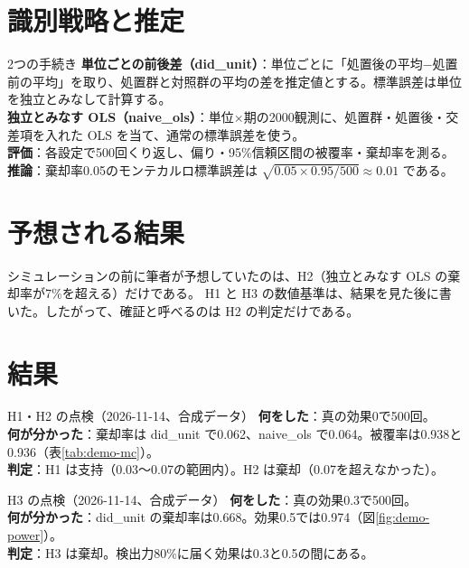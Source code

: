 \documentclass[a4paper,10pt]{ltjsarticle}
\begin{document}
\section{識別戦略と推定}\label{sec:demo-design}

\begin{design}{2つの手続き}
\textbf{単位ごとの前後差（did\_unit）}：単位ごとに「処置後の平均−処置前の平均」を取り、処置群と対照群の平均の差を推定値とする。標準誤差は単位を独立とみなして計算する。\\
\textbf{独立とみなす OLS（naive\_ols）}：単位×期の2000観測に、処置群・処置後・交差項を入れた OLS を当て、通常の標準誤差を使う。\\
\textbf{評価}：各設定で500回くり返し、偏り・95\%信頼区間の被覆率・棄却率を測る。\\
\textbf{推論}：棄却率0.05のモンテカルロ標準誤差は $\sqrt{0.05\times0.95/500}\approx0.01$ である。
\end{design}

\section{予想される結果}\label{sec:demo-expected}
シミュレーションの前に筆者が予想していたのは、H2（独立とみなす OLS の棄却率が7\%を超える）だけである。
H1 と H3 の数値基準は、結果を見た後に書いた。したがって、確証と呼べるのは H2 の判定だけである。

\section{結果}\label{sec:demo-result}

\begin{result}{H1・H2 の点検（2026-11-14、合成データ）}
\textbf{何をした}：真の効果0で500回。\\
\textbf{何が分かった}：棄却率は did\_unit で0.062、naive\_ols で0.064。被覆率は0.938と0.936（表\ref{tab:demo-mc}）。\\
\textbf{判定}：H1 は支持（0.03〜0.07の範囲内）。H2 は棄却（0.07を超えなかった）。
\end{result}

\begin{result}{H3 の点検（2026-11-14、合成データ）}
\textbf{何をした}：真の効果0.3で500回。\\
\textbf{何が分かった}：did\_unit の棄却率は0.668。効果0.5では0.974（図\ref{fig:demo-power}）。\\
\textbf{判定}：H3 は棄却。検出力80\%に届く効果は0.3と0.5の間にある。
\end{result}
\end{document}
